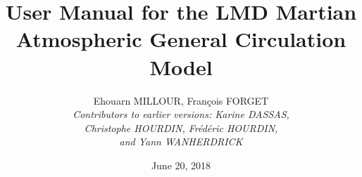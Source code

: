 \documentclass{report}
\begin{document}


\sloppy



\title{User Manual for the LMD Martian Atmospheric General Circulation Model}
\author{Ehouarn MILLOUR, Fran\c{c}ois FORGET  \\ \it{Contributors to earlier versions}: Karine DASSAS, \\ Christophe HOURDIN, Fr\'ed\'eric HOURDIN, \\  and Yann WANHERDRICK}
\date{June 20, 2018}

\maketitle
\tableofcontents



%










\appendix



 



\end{document}
